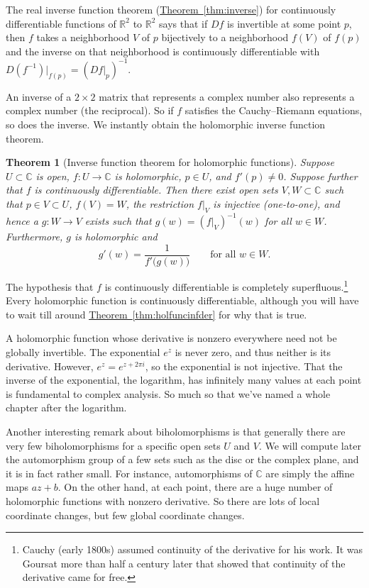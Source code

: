 \documentclass[12pt,openany]{book}
\newcommand{\C}{{\mathbb{C}}}
\newcommand{\R}{{\mathbb{R}}}
\theoremstyle{plain}
\newtheorem{thm}{Theorem}[section]
\theoremstyle{remark}
\theoremstyle{definition}
\theoremstyle{exercise}
\theoremstyle{example}
\newcommand{\thmref}[1]{\hyperref[#1]{Theorem~\ref*{#1}}}
\begin{document}
The real inverse function theorem (\thmref{thm:inverse})
for continuously differentiable
functions of $\R^2$ to $\R^2$
says that if $Df$ is invertible at some point $p$, then $f$ takes a
neighborhood $V$ of $p$ bijectively to a neighborhood $f(V)$
of $f(p)$ and the inverse on that neighborhood is continuously
differentiable with $D(f^{-1})|_{f(p)} = (Df|_p)^{-1}$.

An inverse of a $2 \times 2$ matrix that represents a complex number also
represents a complex number (the reciprocal).  So if $f$
satisfies the Cauchy--Riemann equations, so does the inverse.
We instantly obtain the holomorphic inverse function theorem.

\begin{thm}[Inverse function theorem for holomorphic functions]
\label{thm:inversehol}
Suppose $U \subset \C$ is open, $f \colon U \to \C$ is holomorphic,
$p \in U$, and $f'(p) \not= 0$.  Suppose further that $f$ is continuously
differentiable.
Then there exist open sets $V, W \subset \C$ such that
$p \in V \subset U$, $f(V) = W$, the restriction $f|_V$ is injective
(one-to-one),
and hence a $g \colon W \to V$ exists such that
$g(w) = (f|_V)^{-1}(w)$ for all $w \in W$.
Furthermore, $g$ is holomorphic and
\begin{equation*}
g'(w) = \frac{1}{f'\bigl(g(w)\bigr)} \qquad \text{for all $w \in W$}.
\end{equation*}
\end{thm}

The hypothesis that $f$ is continuously differentiable is completely
superfluous.\footnote{Cauchy (early 1800s)
assumed continuity of the derivative for his work.
It was Goursat more than half a century later that showed that continuity of the
derivative came for free.}
Every holomorphic function is continuously
differentiable, although you will have to wait till around
\thmref{thm:holfuncinfder} for why that is true.

A holomorphic function whose derivative is nonzero
everywhere need not be globally invertible.  The exponential $e^z$
is never zero, and thus neither is its derivative.  However, $e^{z} = e^{z+2\pi i}$,
so the
exponential is not injective.
That the inverse of the
exponential, the logarithm,
has infinitely many values at each point is fundamental to complex analysis.
So much so that we've named a whole chapter after the logarithm.

Another interesting remark about biholomorphisms is that generally
there are very few biholomorphisms for a specific open sets $U$ and $V$.  We will
compute later the automorphism group of a few sets such as the disc or the
complex plane, and it is in fact rather small.
For instance, automorphisms of $\C$ are simply the affine maps $a
z + b$.  On the other hand, at each point, there are a huge number of
holomorphic functions with nonzero derivative.  So there are lots of local
coordinate changes, but few global coordinate changes.
\end{document}
